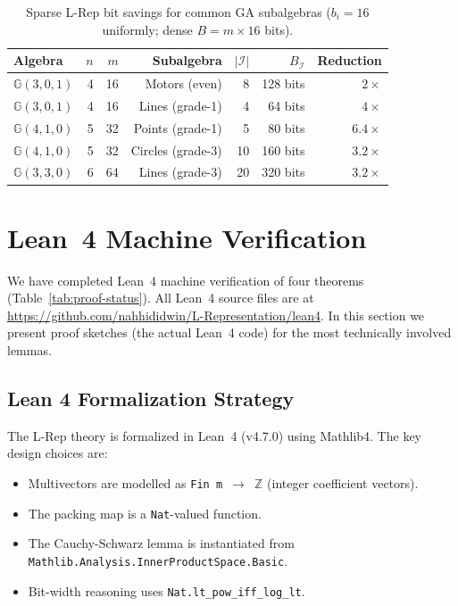\documentclass[11pt,a4paper]{article}
\theoremstyle{definition}
\theoremstyle{plain}
\theoremstyle{remark}
\newcommand{\GA}{\mathbb{G}}
\begin{document}
\begin{table}[h]
\centering
\caption{Sparse L-Rep bit savings for common GA subalgebras
($b_i=16$ uniformly; dense $B=m\times16$ bits).}
\label{tab:sparse}
\begin{tabular}{lrrrrrr}
\toprule
Algebra & $n$ & $m$ & Subalgebra & $|\mathcal{I}|$ & $B_{\mathcal{I}}$ & Reduction \\
\midrule
$\GA(3,0,1)$ & 4 & 16 & Motors (even) & 8 & 128 bits & $2\times$ \\
$\GA(3,0,1)$ & 4 & 16 & Lines (grade-1) & 4 & 64 bits & $4\times$ \\
$\GA(4,1,0)$ & 5 & 32 & Points (grade-1) & 5 & 80 bits & $6.4\times$ \\
$\GA(4,1,0)$ & 5 & 32 & Circles (grade-3) & 10 & 160 bits & $3.2\times$ \\
$\GA(3,3,0)$ & 6 & 64 & Lines (grade-3) & 20 & 320 bits & $3.2\times$ \\
\bottomrule
\end{tabular}
\end{table}

\section{Lean~4 Machine Verification}
\label{sec:lean}

We have completed Lean~4 machine verification of four theorems
(Table~\ref{tab:proof-status}).
All Lean~4 source files are at \url{https://github.com/nahhididwin/L-Representation/lean4}.
In this section we present proof sketches (the actual Lean~4 code) for
the most technically involved lemmas.

\subsection{Lean 4 Formalization Strategy}

The L-Rep theory is formalized in Lean~4 (v4.7.0) using Mathlib4.
The key design choices are:

\begin{itemize}
  \item Multivectors are modelled as \texttt{Fin m $\to$ $\mathbb{Z}$}
        (integer coefficient vectors).
  \item The packing map is a \texttt{Nat}-valued function.
  \item The Cauchy-Schwarz lemma is instantiated from \texttt{Mathlib.Analysis.InnerProductSpace.Basic}.
  \item Bit-width reasoning uses \texttt{Nat.lt\_pow\_iff\_log\_lt}.
\end{itemize}
\end{document}
